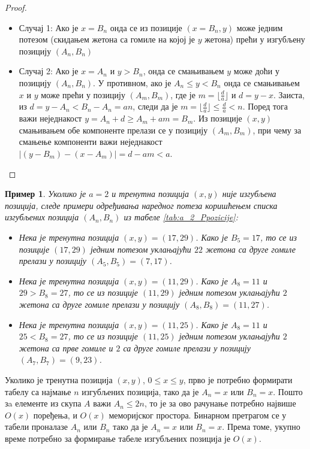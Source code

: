 \documentclass[a4paper]{article}
\newtheorem{example}{Пример}
\begin{document}
\begin{proof}
	\begin{itemize}
		\item \label{case:slucaj1} Случај 1: Ако је $ x = B_{n} $ онда се из позиције $ (x = B_{n}, y) $ може једним потезом (скидањем жетона са гомиле на којој је $ y $ жетона) прећи у изгубљену позицију $ (A_{n}, B_{n}) $ 
		\item \label{case:slucaj2} Случај 2: Ако је $ x = A_{n} $ и $ y > B_{n} $, онда се смањивањем $ y $ може доћи у позицију $ (A_{n}, B_{n}) $. У противном, ако је $ A_{n} \le y < B_{n} $ онда се смањивањем $ x $ и $ y $ може прећи у позицију $ (A_{m}, B_{m}) $, где је $ m = \lfloor \frac{d}{a} \rfloor $ и $ d = y - x $. Заиста, из $ d = y - A_{n} < B_{n} - A_{n} = an $, следи да је  $ m = \lfloor \frac{d}{a} \rfloor \le \frac{d}{a} < n $. Поред тога важи неједнакост $ y = A_{n} + d \ge A_{m} + am = B_m $. Из позиције $ (x, y) $ смањивањем обе компоненте прелази се у позицију $ (A_{m}, B_{m}) $, при чему за смањење компоненти важи неједнакост $ |(y - B_{m}) - (x - A_{m})| = d - am < a $.
	\end{itemize}
	
\end{proof}

\begin{example}
	Уколико је $ a = 2 $ и тренутна позиција $ (x, y) $ није изгубљена позиција, следе примери одређивања наредног потеза коришћењем списка изгубљених позиција $ (A_{n}, B_{n}) $ из табеле \ref{tab:a_2_Ppozicije}:
	\begin{itemize}
		\item Нека је тренутна позиција $ (x, y) = (17, 29) $. Како је $ B_{5} = 17 $, то се из позиције $ (17, 29) $ једним потезом уклањајући $ 22 $ жетона са друге гомиле прелази у позицију $ (A_{5}, B_{5}) = (7, 17) $. 
		\item Нека је тренутна позиција $ (x, y) = (11, 29) $. Како је $ A_{8} = 11 $ и $ 29 > B_{8} = 27 $, то се из позиције $ (11, 29) $ једним потезом уклањајући $ 2 $ жетона са друге гомиле прелази у позицију $ (A_{8}, B_{8}) = (11, 27) $.
		\item Нека је тренутна позиција $ (x, y) = (11, 25) $. Како је $ A_{8} = 11 $ и $ 25 < B_{8} = 27 $, то се из позиције $ (11, 25) $ једним потезом уклањајући $ 2 $ жетона са прве гомиле и $ 2 $ са друге гомиле прелази у позицију $ (A_{7}, B_{7}) = (9, 23) $.
	\end{itemize}
\end{example}

Уколико је тренутна позиција $ (x, y) $, $ 0 \leq x \leq y $, прво је потребно формирати табелу са најмање $ n $ изгубљених позиција, тако да је $ A_{n} = x $ или $ B_{n} = x $. Пошто зa елементе из скупа $ A $ важи $ A_{n} \leq 2n $, то је за ово рачунање потребно највише $ O(x) $ поређења, и $ O(x) $ меморијског простора. Бинарном претрагом се у табели проналазе $ A_{n} $ или $ B_{n} $ тако да је $ A_{n} = x $ или $ B_{n} = x $. Према томе, укупно време потребно за формирање табеле изгубљених позиција је $ O(x) $.
\end{document}
